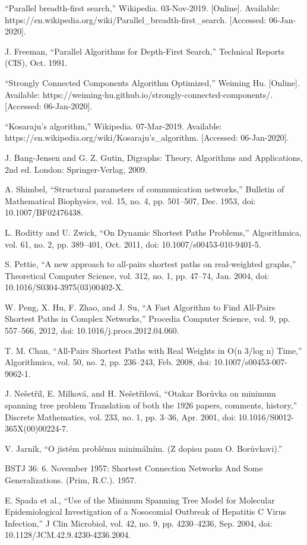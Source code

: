 \documentclass[journal,twoside,web]{ieeecolor}
\begin{document}
\begin{thebibliography}{9}
     “Parallel breadth-first search,” Wikipedia. 03-Nov-2019. [Online]. Available: https://en.wikipedia.org/wiki/Parallel{\_}breadth-first{\_}search. [Accessed: 06-Jan-2020].

     J. Freeman, “Parallel Algorithms for Depth-First Search,” Technical Reports (CIS), Oct. 1991.

     “Strongly Connected Components Algorithm Optimized,” Weiming Hu. [Online]. Available: https://weiming-hu.github.io/strongly-connected-components/. [Accessed: 06-Jan-2020].

     “Kosaraju’s algorithm,” Wikipedia. 07-Mar-2019.  Available: https://en.wikipedia.org/wiki/Kosaraju's{\_}algorithm. [Accessed: 06-Jan-2020].

     J. Bang-Jensen and G. Z. Gutin, Digraphs: Theory, Algorithms and Applications, 2nd ed. London: Springer-Verlag, 2009.

     A. Shimbel, “Structural parameters of communication networks,” Bulletin of Mathematical Biophysics, vol. 15, no. 4, pp. 501–507, Dec. 1953, doi: 10.1007/BF02476438.

     L. Roditty and U. Zwick, “On Dynamic Shortest Paths Problems,” Algorithmica, vol. 61, no. 2, pp. 389–401, Oct. 2011, doi: 10.1007/s00453-010-9401-5.

     S. Pettie, “A new approach to all-pairs shortest paths on real-weighted graphs,” Theoretical Computer Science, vol. 312, no. 1, pp. 47–74, Jan. 2004, doi: 10.1016/S0304-3975(03)00402-X.

     W. Peng, X. Hu, F. Zhao, and J. Su, “A Fast Algorithm to Find All-Pairs Shortest Paths in Complex Networks,” Procedia Computer Science, vol. 9, pp. 557–566, 2012, doi: 10.1016/j.procs.2012.04.060.

     T. M. Chan, “All-Pairs Shortest Paths with Real Weights in O(n 3/log n) Time,” Algorithmica, vol. 50, no. 2, pp. 236–243, Feb. 2008, doi: 10.1007/s00453-007-9062-1.

     J. Nešetřil, E. Milková, and H. Nešetřilová, “Otakar Borůvka on minimum spanning tree problem Translation of both the 1926 papers, comments, history,” Discrete Mathematics, vol. 233, no. 1, pp. 3–36, Apr. 2001, doi: 10.1016/S0012-365X(00)00224-7.

     V. Jarník, “O jistém problému minimálním. (Z dopisu panu O. Borůvkovi).”
    
     BSTJ 36: 6. November 1957: Shortest Connection Networks And Some Generalizations. (Prim, R.C.). 1957.

     E. Spada et al., “Use of the Minimum Spanning Tree Model for Molecular Epidemiological Investigation of a Nosocomial Outbreak of Hepatitis C Virus Infection,” J Clin Microbiol, vol. 42, no. 9, pp. 4230–4236, Sep. 2004, doi: 10.1128/JCM.42.9.4230-4236.2004.

\end{thebibliography}
\end{document}
